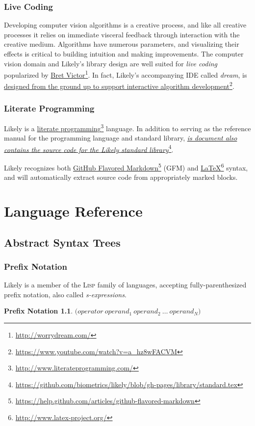 \documentclass[numbers=noenddot]{scrbook}
\newcommand{\noun}[1]{\textsc{#1}}
\newcommand{\fref}[2]{\href{#1}{#2}\footnote{\href{#1}{#1}}}
\begin{document}
\section{Live Coding}
Developing computer vision algorithms is a creative process, and like all creative processes it relies on immediate visceral feedback through interaction with the creative medium.
Algorithms have numerous parameters, and visualizing their effects is critical to building intuition and making improvements.
The computer vision domain and Likely's library design are well suited for \emph{live coding} popularized by \fref{http://worrydream.com/}{Bret Victor}.
In fact, Likely's accompanying IDE called \emph{dream}, is \fref{https://www.youtube.com/watch?v=a\_hz8wFACVM}{designed from the ground up to support interactive algorithm development}.

\section{Literate Programming}
Likely is a \fref{http://www.literateprogramming.com/}{literate programming} language.
In addition to serving as the reference manual for the programming language and standard library, \fref{https://github.com/biometrics/likely/blob/gh-pages/library/standard.tex}{\emph{is document also contains the source code for the Likely standard library}}.

Likely recognizes both \fref{https://help.github.com/articles/github-flavored-markdown}{GitHub Flavored Markdown} (GFM) and \fref{http://www.latex-project.org/}{\LaTeX} syntax, and will automatically extract source code from appropriately marked blocks.

\part{Language Reference}
\chapter{Abstract Syntax Trees}
\section{Prefix Notation}
Likely is a member of the \noun{Lisp} family of languages, accepting fully-parenthesized prefix notation, also called \emph{s-expressions}.

\theoremstyle{dotless}
\newtheorem*{PN}{Prefix Notation \nopunct}
\begin{PN}
$\boldsymbol{(} operator\ operand_1\ operand_2\ \dots\ operand_N \boldsymbol{)}$
\end{PN}
\end{document}
